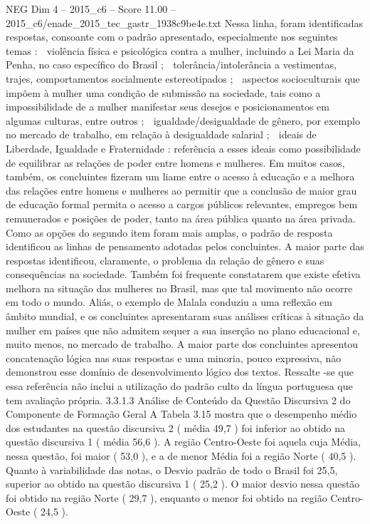 \begin{textsample}{NEG Dim 4 – 2015\_c6 – Score 11.00 – 2015\_c6/enade\_2015\_tec\_gastr\_1938c9be4e.txt}
Nessa linha, foram identificadas respostas, consoante com o padrão apresentado, especialmente nos seguintes temas :  violência física e psicológica contra a mulher, incluindo a Lei Maria da Penha, no caso específico do Brasil ;  tolerância/intolerância a vestimentas, trajes, comportamentos socialmente estereotipados ;  aspectos socioculturais que impõem à mulher uma condição de submissão na sociedade, tais como a impossibilidade de a mulher manifestar seus desejos e posicionamentos em algumas culturas, entre outros ;  igualdade/desigualdade de gênero, por exemplo no mercado de trabalho, em relação à desigualdade salarial ;  ideais de Liberdade, Igualdade e Fraternidade : referência a esses ideais como possibilidade de equilibrar as relações de poder entre homens e mulheres.
Em muitos casos, também, os concluintes fizeram um liame entre o acesso à educação e a melhora das relações entre homens e mulheres ao permitir que a conclusão de maior grau de educação formal permita o acesso a cargos públicos relevantes, empregos bem remunerados e posições de poder, tanto na área pública quanto na área privada.
Como as opções do segundo item foram mais amplas, o padrão de resposta identificou as linhas de pensamento adotadas pelos concluintes.
A maior parte das respostas identificou, claramente, o problema da relação de gênero e suas consequências na sociedade.
Também foi frequente constatarem que existe efetiva melhora na situação das mulheres no Brasil, mas que tal movimento não ocorre em todo o mundo.
Aliás, o exemplo de Malala conduziu a uma reflexão em âmbito mundial, e os concluintes apresentaram suas análises críticas à situação da mulher em países que não admitem sequer a sua inserção no plano educacional e, muito menos, no mercado de trabalho.
A maior parte dos concluintes apresentou concatenação lógica nas suas respostas e uma minoria, pouco expressiva, não demonstrou esse domínio de desenvolvimento lógico dos textos.
Ressalte -se que essa referência não inclui a utilização do padrão culto da língua portuguesa que tem avaliação própria. 3.3.1.3 Análise de Conteúdo da Questão Discursiva 2 do Componente de Formação Geral A Tabela 3.15 mostra que o desempenho médio dos estudantes na questão discursiva 2 ( média 49,7 ) foi inferior ao obtido na questão discursiva 1 ( média 56,6 ).
A região Centro-Oeste foi aquela cuja Média, nessa questão, foi maior ( 53,0 ), e a de menor Média foi a região Norte ( 40,5 ).
Quanto à variabilidade das notas, o Desvio padrão de todo o Brasil foi 25,5, superior ao obtido na questão discursiva 1 ( 25,2 ).
O maior desvio nessa questão foi obtido na região Norte ( 29,7 ), enquanto o menor foi obtido na região Centro-Oeste ( 24,5 ).

\end{textsample}
